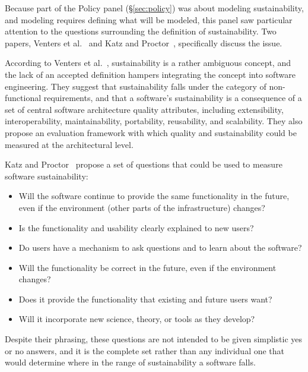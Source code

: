 \documentclass[11pt, oneside]{amsart}
\begin{document}
Because part of the Policy panel (\S\ref{sec:policy}) was about
modeling sustainability, and modeling requires defining what will be
modeled, this panel saw particular attention to the questions
surrounding the definition of sustainability. Two papers, Venters et
al.~\cite{Venters_WSSSPE} and Katz and Proctor~\cite{Katz_WSSSPE},
specifically discuss the issue. 

According to Venters et al.~\cite{Venters_WSSSPE}, sustainability is a
rather ambiguous concept, and the lack of an accepted definition
hampers integrating the concept into software engineering. They
suggest that sustainability falls under the category of non-functional
requirements, and that a software's sustainability is a consequence of
a set of central software architecture quality attributes, including
extensibility, interoperability, maintainability, portability,
reusability, and scalability. They also propose an evaluation
framework with which quality and sustainability could be measured at
the architectural level.

Katz and Proctor~\cite{Katz_WSSSPE} propose a set of questions that could be
used to measure software sustainability:
\begin{itemize}
\item Will the software continue to provide the same functionality in the future,
      even if the environment (other parts of the infrastructure) changes?
\item Is the functionality and usability clearly explained to new users?
\item Do users have a mechanism to ask questions and to learn about the software?
\item Will the functionality be correct in the future, even if the environment changes?
\item Does it provide the functionality that existing and future users want?
\item Will it incorporate new science, theory, or tools as they develop?
\end{itemize}
Despite their phrasing, these questions are not intended to be given
simplistic yes or no answers, and it is the complete set rather than
any individual one that would determine where in the range of
sustainability a software falls.
\end{document}
